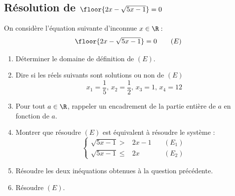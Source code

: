 \subsection{Résolution de $\floor{2x-\sqrt{5x-1}} =0 $}
\begin{exercice}
On considère l'équation suivante d'inconnue $x\in \R : $ 
$$\floor{2x-\sqrt{5x-1}} =0 \quad \quad (E)$$
\begin{enumerate}
\item Déterminer le domaine de définition de $(E)$. 
\item Dire si les réels suivants sont solutions ou non de $(E)$
$$x_1 = \frac{1}{5}, \, x_2 = \frac{1}{2}, \, x_3 =1,\, x_4=12$$
\item Pour tout $a\in \R$, rappeler  un encadrement de la partie entière de $a$ en fonction de $a$. 
\item Montrer que résoudre $(E)$ est équivalent à résoudre le système :
$$\left\{\begin{array}{clc}
\sqrt{5x-1} >&2x-1 &\quad(E_1)\\ 
\sqrt{5x-1} \leq &2x&\quad(E_2)
\end{array}\right.
$$
\item Résoudre les deux inéquations obtenues à la question précédente. 
\item Résoudre $(E)$. 
\end{enumerate}
\end{exercice}

